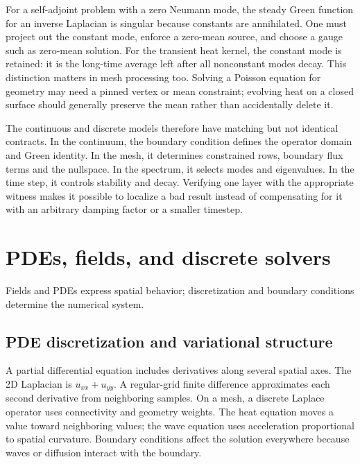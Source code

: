 For a self-adjoint problem with a zero Neumann mode, the steady Green function for an inverse Laplacian is singular because constants are annihilated. One must project out the constant mode, enforce a zero-mean source, and choose a gauge such as zero-mean solution. For the transient heat kernel, the constant mode is retained: it is the long-time average left after all nonconstant modes decay. This distinction matters in mesh processing too. Solving a Poisson equation for geometry may need a pinned vertex or mean constraint; evolving heat on a closed surface should generally preserve the mean rather than accidentally delete it.

The continuous and discrete models therefore have matching but not identical contracts. In the continuum, the boundary condition defines the operator domain and Green identity. In the mesh, it determines constrained rows, boundary flux terms and the nullspace. In the spectrum, it selects modes and eigenvalues. In the time step, it controls stability and decay. Verifying one layer with the appropriate witness makes it possible to localize a bad result instead of compensating for it with an arbitrary damping factor or a smaller timestep.

\section{PDEs, fields, and discrete solvers}\label{04-visual-computing-ii-ch030-pdes-fields-and-discrete-solvers}

Fields and PDEs express spatial behavior; discretization and boundary conditions determine the numerical system.

\subsection{PDE discretization and variational structure}\label{04-visual-computing-ii-ch030-pde-discretization-and-variational-structure}

A partial differential equation includes derivatives along several spatial axes. The 2D Laplacian is \(u_{xx}+u_{yy}\). A regular-grid finite difference approximates each second derivative from neighboring samples. On a mesh, a discrete Laplace operator uses connectivity and geometry weights. The heat equation moves a value toward neighboring values; the wave equation uses acceleration proportional to spatial curvature. Boundary conditions affect the solution everywhere because waves or diffusion interact with the boundary.

